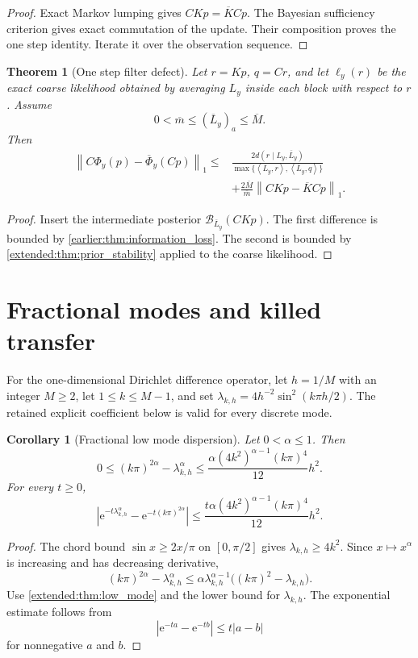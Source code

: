 \documentclass[11pt,letterpaper]{article}
\newtheorem{theorem}{Theorem}[section]
\theoremstyle{plain}
\theoremstyle{plain}
\theoremstyle{plain}
\newtheorem{corollary}[corollary]{Corollary}
\theoremstyle{definition}
\theoremstyle{definition}
\theoremstyle{definition}
\theoremstyle{definition}
\theoremstyle{definition}
\theoremstyle{remark}
\theoremstyle{remark}
\theoremstyle{remark}
\theoremstyle{remark}
\theoremstyle{remark}
\newcommand{\norm}[1]{\left\lVert#1\right\rVert}
\theoremstyle{remark}
\newcommand{\Bcal}{\mathcal B}
\newcommand{\e}{\mathrm e}
\newcommand{\abs}[1]{\left\lvert#1\right\rvert}
\newcommand{\ip}[2]{\left\langle#1,#2\right\rangle}
\let\KomorebiPrimitiveMathcal\mathcal
\renewcommand{\mathcal}[1]{{\KomorebiPrimitiveMathcal{#1}}}
\let\KomorebiPrimitivemathrm\mathrm
\renewcommand{\mathrm}[1]{{\KomorebiPrimitivemathrm{#1}}}
\begin{document}
\begin{proof}
Exact Markov lumping gives \(CKp=\overline KCp\). The Bayesian sufficiency criterion gives exact commutation of the update. Their composition proves the one step identity. Iterate it over the observation sequence.
\end{proof}

\begin{theorem}[One step filter defect]\label{earlier:record:017}\label{earlier:thm:filter_defect}
Let \(r=Kp\), \(q=Cr\), and let \(\ell_y(r)\) be the exact coarse likelihood obtained by averaging \(L_y\) inside each block with respect to \(r\). Assume
\[
0<\overline m\leq(\overline L_y)_a\leq\overline M.
\]
Then
\[
\begin{aligned}
\norm{C\Phi_y(p)-\overline\Phi_y(Cp)}_1
\leq{}&
\frac{2d(r\mid L_y,\overline L_y)}
{\max\{\ip{L_y}{r},\ip{\overline L_y}{q}\}}\\
&+
\frac{2\overline M}{\overline m}
\norm{CKp-\overline KCp}_1.
\end{aligned}
\]
\end{theorem}

\begin{proof}
Insert the intermediate posterior \(\Bcal_{\overline L_y}(CKp)\). The first difference is bounded by \cref{earlier:thm:information_loss}. The second is bounded by \cref{extended:thm:prior_stability} applied to the coarse likelihood.
\end{proof}


\FloatBarrier
\section{Fractional modes and killed transfer}\label{earlier:section:04}
For the one-dimensional Dirichlet difference operator, let $h=1/M$ with an integer $M\geq2$, let $1\leq k\leq M-1$, and set $\lambda_{k,h}=4h^{-2}\sin^2(k\pi h/2)$. The retained explicit coefficient below is valid for every discrete mode.
\begin{corollary}[Fractional low mode dispersion]\label{earlier:record:018}\label{earlier:cor:fractional_low_mode_dispersion}
Let \(0<\alpha\leq1\). Then
\[
0
\leq
(k\pi)^{2\alpha}-\lambda_{k,h}^\alpha
\leq
\frac{\alpha(4k^2)^{\alpha-1}(k\pi)^4}{12}h^2.
\]
For every \(t\geq0\),
\[
\abs{
\e^{-t\lambda_{k,h}^\alpha}
-
\e^{-t(k\pi)^{2\alpha}}
}
\leq
\frac{t\alpha(4k^2)^{\alpha-1}(k\pi)^4}{12}h^2.
\]
\end{corollary}

\begin{proof}
The chord bound \(\sin x\geq2x/\pi\) on \([0,\pi/2]\) gives \(\lambda_{k,h}\geq4k^2\). Since \(x\mapsto x^\alpha\) is increasing and has decreasing derivative,
\[
(k\pi)^{2\alpha}-\lambda_{k,h}^\alpha
\leq
\alpha\lambda_{k,h}^{\alpha-1}
\bigl((k\pi)^2-\lambda_{k,h}\bigr).
\]
Use \cref{extended:thm:low_mode} and the lower bound for \(\lambda_{k,h}\). The exponential estimate follows from
\[
\abs{\e^{-ta}-\e^{-tb}}
\leq t\abs{a-b}
\]
for nonnegative \(a\) and \(b\).
\end{proof}
\end{document}

